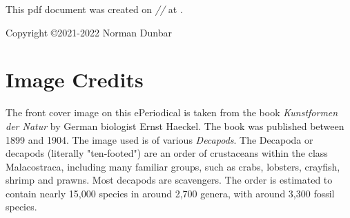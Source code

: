 \documentclass[11pt,fleqn]{book} %
\begin{document}


\noindent This pdf document was created on \textit{\the\day/\the\month/\the\year} at \textit{\DTMcurrenttime}.

\noindent Copyright \copyright 2021-2022 Norman Dunbar\\ %



\pagestyle{empty} %


\tableofcontents %
\lstlistoflistings

\cleardoublepage %

\pagestyle{fancy} %




\chapter{Image Credits}
The front cover image on this ePeriodical is taken from the book \emph{Kunstformen der Natur} by German biologist Ernst Haeckel. The book was published between 1899 and 1904. The image used is of various \emph{Decapods}. The Decapoda or decapods (literally "ten-footed") are an order of crustaceans within the class Malacostraca, including many familiar groups, such as crabs, lobsters, crayfish, shrimp and prawns. Most decapods are scavengers. The order is estimated to contain nearly 15,000 species in around 2,700 genera, with around 3,300 fossil species.
\end{document}
